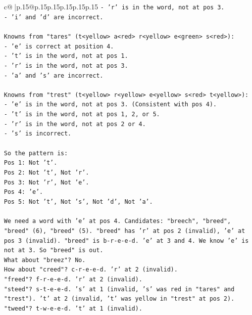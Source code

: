 \documentclass{article}
\begin{document}
{\begin{supertabular}{c@{$\;$}|p{.15\linewidth}@{}p{.15\linewidth}p{.15\linewidth}p{.15\linewidth}p{.15\linewidth}p{.15\linewidth}}
{{{\texttt{{-} 'r' is in the word, not at pos 3.} \\
\texttt{{-} 'i' and 'd' are incorrect.} \\
\\ 
\texttt{Knowns from "tares" (t<yellow> a<red> r<yellow> e<green> s<red>):} \\
\texttt{{-} 'e' is correct at position 4.} \\
\texttt{{-} 't' is in the word, not at pos 1.} \\
\texttt{{-} 'r' is in the word, not at pos 3.} \\
\texttt{{-} 'a' and 's' are incorrect.} \\
\\ 
\texttt{Knowns from "trest" (t<yellow> r<yellow> e<yellow> s<red> t<yellow>):} \\
\texttt{{-} 'e' is in the word, not at pos 3. (Consistent with pos 4).} \\
\texttt{{-} 't' is in the word, not at pos 1, 2, or 5.} \\
\texttt{{-} 'r' is in the word, not at pos 2 or 4.} \\
\texttt{{-} 's' is incorrect.} \\
\\ 
\texttt{So the pattern is:} \\
\texttt{Pos 1: Not 't'.} \\
\texttt{Pos 2: Not 't', Not 'r'.} \\
\texttt{Pos 3: Not 'r', Not 'e'.} \\
\texttt{Pos 4: 'e'.} \\
\texttt{Pos 5: Not 't', Not 's', Not 'd', Not 'a'.} \\
\\ 
\texttt{We need a word with 'e' at pos 4. Candidates: "breech", "breed", "breed" (6), "breed" (5). "breed" has 'r' at pos 2 (invalid), 'e' at pos 3 (invalid). "breed" is b{-}r{-}e{-}e{-}d. 'e' at 3 and 4. We know 'e' is not at 3. So "breed" is out.} \\
\texttt{What about "breez"? No.} \\
\texttt{How about "creed"? c{-}r{-}e{-}e{-}d. 'r' at 2 (invalid).} \\
\texttt{"freed"? f{-}r{-}e{-}e{-}d. 'r' at 2 (invalid).} \\
\texttt{"steed"? s{-}t{-}e{-}e{-}d. 's' at 1 (invalid, 's' was red in "tares" and "trest"). 't' at 2 (invalid, 't' was yellow in "trest" at pos 2).} \\
\texttt{"tweed"? t{-}w{-}e{-}e{-}d. 't' at 1 (invalid).} \\
}}}
\end{supertabular}}
\end{document}
